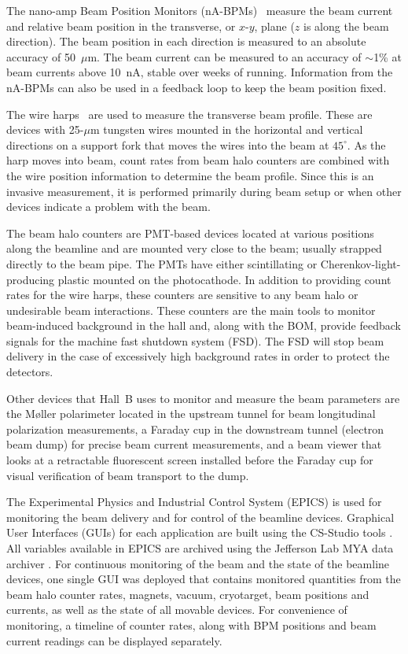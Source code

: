 The nano-amp Beam Position Monitors (nA-BPMs)~\cite{naBPM} measure the beam current and relative beam position
in the transverse, or {$x$-$y$}, plane ($z$ is along the beam direction).  The beam position in each direction is
measured to an absolute accuracy of 50~$\mu$m. The beam current can be measured to an accuracy of $\sim$1\%
at beam currents above 10~nA, stable over weeks of running.  Information from the nA-BPMs can also be used in a
feedback  loop to keep the beam position fixed.

The wire harps~\cite{wireharp} are used to measure the transverse beam profile. These are devices with
25-$\mu$m tungsten wires mounted in the horizontal and vertical directions on a support fork that moves the wires
into the beam at $45^\circ$. As the harp moves into beam, count rates from beam halo counters are combined with
the wire position information to determine the beam profile. Since this is an invasive measurement, it is performed
primarily during beam setup or when other devices indicate a problem with the beam. 

The beam halo counters are PMT-based devices located at various positions along the beamline and are mounted very
close to the beam; usually strapped directly to the beam pipe. The PMTs have either scintillating or
Cherenkov-light-producing plastic mounted on the photocathode. In addition to providing count rates for the wire
harps, these counters are sensitive to any beam halo or undesirable beam interactions. These counters are the main
tools to monitor beam-induced background in the hall and, along with the BOM, provide feedback signals for the
machine fast shutdown system (FSD). The FSD will stop beam delivery in the case of excessively high background
rates in order to protect the detectors. 

Other devices that Hall~B uses to monitor and measure the beam parameters are the M{\o}ller polarimeter located
in the upstream tunnel for beam longitudinal polarization measurements, a Faraday cup in the downstream tunnel
(electron beam dump) for precise beam current measurements, and a beam viewer that looks at a retractable
fluorescent screen installed before the Faraday cup for visual verification of beam transport to the dump.     

The Experimental Physics and Industrial Control System (EPICS) \cite{EPICS} is used for monitoring the beam
delivery and for control of the beamline devices. Graphical User Interfaces (GUIs) for each application are built
using the CS-Studio tools \cite{CS-Studio}. All variables available in EPICS are archived using the Jefferson Lab
MYA data archiver \cite{MYA}. For continuous monitoring of the beam and the state of the beamline devices, one
single GUI was deployed that contains monitored quantities from the beam halo counter rates, magnets, vacuum,
cryotarget, beam positions and currents, as well as the state of all movable devices. For convenience of monitoring,
a timeline of counter rates, along with BPM positions and beam current readings can be displayed separately.  

